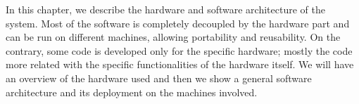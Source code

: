 In this chapter, we describe the hardware and software architecture of the system.
Most of the software is completely decoupled by the hardware part and can be run
on different machines, allowing portability and reusability. On the contrary, some
code is developed only for the specific hardware; mostly the code more related with
the specific functionalities of the hardware itself. We will have an overview of the hardware
used and then we show a general software architecture and its deployment on the
machines involved.




